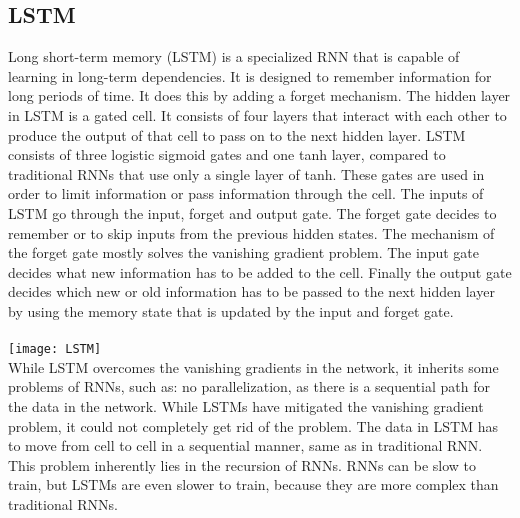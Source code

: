 \subsection{LSTM}
Long short-term memory (LSTM) is a specialized RNN that is capable of learning in long-term dependencies. It is designed to remember information for long periods of time. It does this by adding a forget mechanism. The hidden layer in LSTM is a gated cell. It consists of four layers that interact with each other to produce the output of that cell to pass on to the next hidden layer. LSTM consists of three logistic sigmoid gates and one tanh layer, compared to traditional RNNs that use only a single layer of tanh. These gates are used in order to limit information or pass information through the cell. The inputs of LSTM go through the input, forget and output gate. The forget gate decides to remember or to skip inputs from the previous hidden states. The mechanism of the forget gate mostly solves the vanishing gradient problem. The input gate decides what new information has to be added to the cell. Finally the output gate decides which new or old information has to be passed to the next hidden layer by using the memory state that is updated by the input and forget gate. \\\\

\texttt{[image: LSTM]}
\\ While LSTM overcomes the vanishing gradients in the network, it inherits some problems of RNNs, such as: no parallelization, as there is a sequential path for the data in the network. While LSTMs have mitigated the vanishing gradient problem, it could not completely get rid of the problem. The data in LSTM has to move from cell to cell in a sequential manner, same as in traditional RNN. This problem inherently lies in the recursion of RNNs. RNNs can be slow to train, but LSTMs are even slower to train, because they are more complex than traditional RNNs. 

